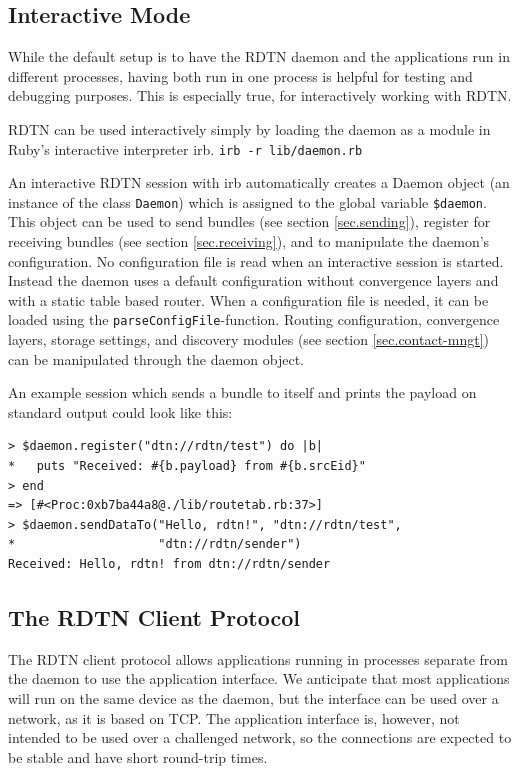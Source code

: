 \documentclass[a4paper]{article}
\begin{document}
\subsection{Interactive Mode}\label{sec.interactive}

While the default setup is to have the RDTN daemon and the applications run in
different processes, having both run in one process is helpful for testing and
debugging purposes. This is especially true, for interactively working with
RDTN. 

RDTN can be used interactively simply by loading the daemon as a module in
Ruby's interactive interpreter irb. {\tt irb -r lib/daemon.rb}

An interactive RDTN session with irb automatically creates a Daemon object (an
instance of the class {\tt Daemon}) which is assigned to the global
variable {\tt \$daemon}. This object can be used to send bundles (see section
\ref{sec.sending}), register for receiving bundles (see section
\ref{sec.receiving}), and to manipulate the daemon's configuration. No
configuration file is read when an interactive session is started. Instead the
daemon uses a default configuration without convergence layers and with a static
table based router. When a configuration file is needed, it can be loaded
using the {\tt parseConfigFile}-function. Routing configuration, convergence
layers, storage settings, and discovery modules (see section
\ref{sec.contact-mngt}) can be manipulated through the daemon object.

An example session which sends a bundle to itself and prints the payload on
standard output could look like this:

\begin{verbatim}
> $daemon.register("dtn://rdtn/test") do |b|
*   puts "Received: #{b.payload} from #{b.srcEid}"
> end
=> [#<Proc:0xb7ba44a8@./lib/routetab.rb:37>]
> $daemon.sendDataTo("Hello, rdtn!", "dtn://rdtn/test",
*                    "dtn://rdtn/sender")
Received: Hello, rdtn! from dtn://rdtn/sender
\end{verbatim}

\subsection{The RDTN Client Protocol}\label{sec.client-protocol}

The RDTN client protocol allows applications running in processes separate from
the daemon to use the application interface. We anticipate that most
applications will run on the same device as the daemon, but the interface can be
used over a network, as it is based on TCP. The application interface is,
however, not intended to be used over a challenged network, so the connections
are expected to be stable and have short round-trip times.
\end{document}
